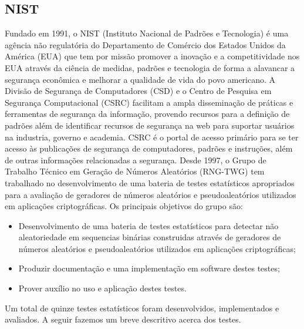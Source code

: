  \subsection{NIST}
  Fundado em 1991, o NIST (Instituto Nacional de Padrões e Tecnologia) é uma agência não regulatória do Departamento de Comércio dos Estados Unidos da América (EUA) que tem por missão promover a inovação e a competitividade nos EUA através da ciência de medidas, padrões e tecnologia de forma a alavancar a segurança econômica e melhorar a qualidade de vida do povo americano.
  A Divisão de Segurança de Computadores (CSD) e o Centro de Pesquisa em Segurança Computacional (CSRC) facilitam a ampla disseminação de práticas e ferramentas de segurança da informação, provendo recursos para a definição de padrões além de identificar recursos de segurança na web para suportar usuários na industria, governo e academia. CSRC é o portal de acesso primário para se ter acesso às publicações de segurança de computadores, padrões e instruções, além de outras informações relacionadas a segurança.
  Desde 1997, o Grupo de Trabalho Técnico em Geração de Números Aleatórios (RNG-TWG) tem trabalhado no desenvolvimento de uma bateria de testes estatísticos apropriados para a avaliação de geradores de números aleatórios e pseudoaleatórios utilizados em aplicações criptográficas. 
  Os principais objetivos do grupo são:
  \begin{itemize}
   \item Desenvolvimento de uma bateria de testes estatísticos para detectar não aleatoriedade em sequencias binárias construidas através de geradores de números aleatórios e pseudoaleatórios utilizados em aplicações criptográficas;
   \item Produzir documentação e uma implementação em software destes testes;
   \item Prover auxílio no uso e aplicação destes testes.
  \end{itemize}
  Um total de quinze testes estatísticos foram desenvolvidos, implementados e avaliados. A seguir fazemos um breve descritivo acerca dos testes.
  
